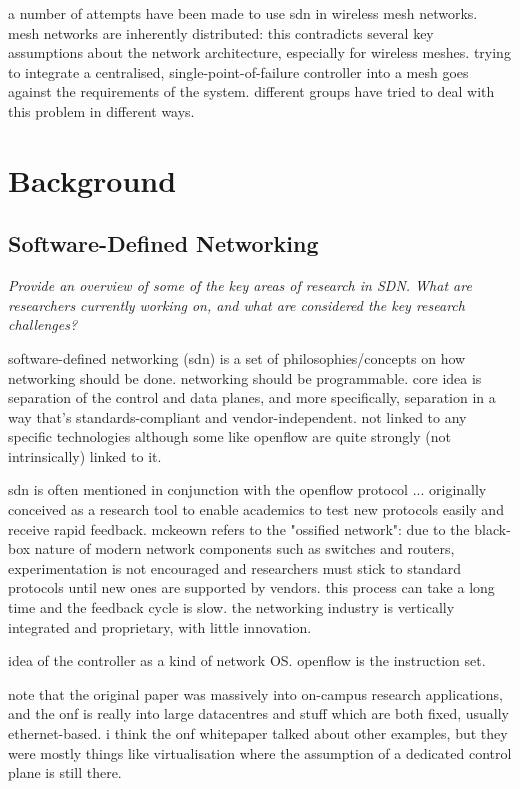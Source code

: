 \documentclass[pdftex,12pt,a4paper]{article}
\begin{document}
a number of attempts have been made to use sdn in wireless mesh networks. mesh networks are inherently distributed: this contradicts several key assumptions about the network architecture, especially for wireless meshes. trying to integrate a centralised, single-point-of-failure controller into a mesh goes against the requirements of the system. different groups have tried to deal with this problem in different ways.

\newpage
\section{Background}
\subsection{Software-Defined Networking}
\emph{Provide an overview of some of the key areas of research in SDN. What are researchers currently working on, and what are considered the key research challenges?}

software-defined networking (sdn) is a set of philosophies/concepts on how networking should be done. networking should be programmable. core idea is separation of the control and data planes, and more specifically, separation in a way that's standards-compliant and vendor-independent. \cite{onf:sdn} not linked to any specific technologies although some like openflow are quite strongly (not intrinsically) linked to it. 

sdn is often mentioned in conjunction with the openflow protocol ... originally conceived as a research tool to enable academics to test new protocols easily and receive rapid feedback. \cite{mckeown:openflow} mckeown refers to the "ossified network": due to the black-box nature of modern network components such as switches and routers, experimentation is not encouraged and researchers must stick to standard protocols until new ones are supported by vendors. this process can take a long time and the feedback cycle is slow. the networking industry is vertically integrated and proprietary, with little innovation. \cite{mckeown:sdn}

idea of the controller as a kind of network OS. openflow is the instruction set.

note that the original paper \cite{mckeown:openflow} was massively into on-campus research applications, and the onf is really into large datacentres and stuff \cite{onf:sdn} which are both fixed, usually ethernet-based. i think the onf whitepaper talked about other examples, but they were mostly things like virtualisation where the assumption of a dedicated control plane is still there.
\end{document}
